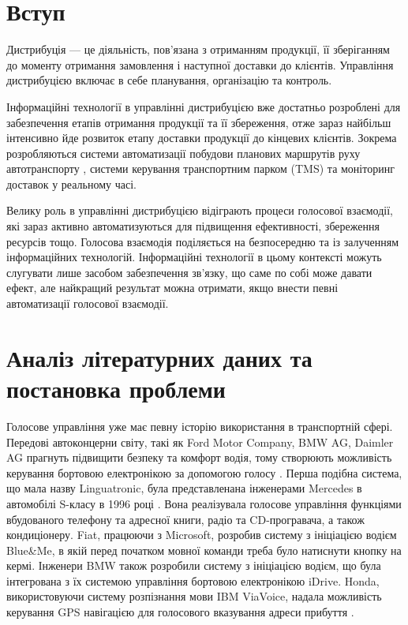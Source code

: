 \section{Вступ}
Дистрибуція — це діяльність, пов'язана з отриманням продукції, її зберіганням до моменту отримання замовлення і наступної доставки до клієнтів. Управління дистрибуцією включає в себе планування, організацію та контроль.

Інформаційні технології в управлінні дистрибуцією вже достатньо розроблені для забезпечення етапів отримання продукції та її збереження, отже зараз найбільш інтенсивно йде розвиток етапу доставки продукції до кінцевих клієнтів. Зокрема розробляються системи автоматизації побудови планових маршрутів руху автотранспорту \cite{art1}, системи керування транспортним парком (TMS) та моніторинг доставок у реальному часі.

Велику роль в управлінні дистрибуцією відіграють процеси голосової взаємодії, які зараз активно автоматизуються для підвищення ефективності, збереження ресурсів тощо. Голосова взаємодія поділяється на безпосередню та із залученням інформаційних технологій. Інформаційні технології в цьому контексті можуть слугувати лише засобом забезпечення зв’язку, що саме по собі може давати ефект, але найкращий результат можна отримати, якщо внести певні автоматизації голосової взаємодії.

\section{Аналіз літературних даних та постановка проблеми}
Голосове управління уже має певну історію використання в транспортній сфері. Передові автоконцерни світу, такі як Ford Motor Company, BMW AG, Daimler AG прагнуть підвищити безпеку та комфорт водія, тому створюють можливість керування бортовою електронікою за допомогою голосу \cite{Kravchenko_2009}. Перша подібна система, що мала назву Linguatronic, була представленана інженерами Mercedes в автомобілі S-класу в 1996 році \cite{Heisterkamp_2001}. Вона реалізувала голосове управління функціями вбудованого телефону та адресної книги, радіо та CD-програвача, а також кондиціонеру. Fiat, працюючи з Microsoft, розробив систему з ініціацією водієм Blue\&Me, в якій перед початком мовної команди треба було натиснути кнопку на кермі. Інженери BMW також розробили систему з ініціацією водієм, що була інтегрована з їх системою управління бортовою електронікою iDrive. Honda, використовуючи систему розпізнання мови IBM ViaVoice, надала можливість керування GPS навігацією для голосового вказування адреси прибуття \cite{Jonsson_2009}.


